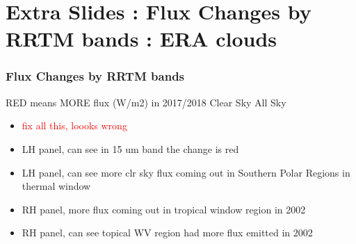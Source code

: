 \documentclass[10pt,t]{beamer}
\begin{document}
\section{Extra Slides : Flux Changes by RRTM bands : ERA clouds}
\begin{frame}
  \frametitle{Flux Changes by RRTM bands}
  RED means MORE flux (W/m2) in 2017/2018 \newline
  \hspace{0.50in} Clear Sky  \hspace{1.75in} All Sky \\
  \begin{center}
  \end{center}

  \begin{small}
    \begin{itemize}
    \item \textcolor{red}{fix all this, loooks wrong}
    \item LH panel, can see in 15 um band the change is red
    \item LH panel, can see more clr sky flux coming out in Southern Polar Regions in thermal window
    \item RH panel, more flux coming out in tropical window region in 2002
    \item RH panel, can see topical WV region had more flux emitted in 2002
    \end{itemize}
  \end{small}
\end{frame}
\end{document}
